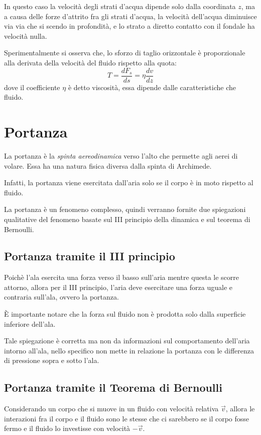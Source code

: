\documentclass[11pt, a4paper, openright]{book}
\theoremstyle{plain}
\theoremstyle{definition}
\begin{document}
In questo caso la velocità degli strati d'acqua dipende solo dalla coordinata $z$, ma a causa delle forze d'attrito fra gli strati d'acqua, la velocità dell'acqua diminuisce via via che si scendo in profondità, e lo strato a diretto contatto con il fondale ha velocità nulla.

Sperimentalmente si osserva che, lo sforzo di taglio orizzontale è proporzionale alla derivata della velocità del fluido rispetto alla quota:
\begin{equation}
    T = \frac{dF_s}{ds} = \eta \frac{dv}{dz}
\end{equation}
dove il coefficiente $\eta$ è detto viscosità, essa dipende dalle caratteristiche che fluido.

\section{Portanza}
La portanza è la \textit{spinta aereodinamica} verso l'alto che permette agli aerei di volare. Essa ha una natura fisica diversa dalla spinta di Archimede.

Infatti, la portanza viene esercitata dall'aria solo se il corpo è in moto rispetto al fluido.

La portanza è un fenomeno complesso, quindi verranno fornite due spiegazioni qualitative del fenomeno basate sul III principio della dinamica e sul teorema di Bernoulli.

\subsection{Portanza tramite il III principio}
Poichè l'ala esercita una forza verso il basso sull'aria mentre questa le scorre attorno, allora per il III principio, l'aria deve esercitare una forza uguale e contraria sull'ala, ovvero la portanza.

È importante notare che la forza sul fluido non è prodotta solo dalla superficie inferiore dell'ala.

Tale spiegazione è corretta ma non da informazioni sul comportamento dell'aria intorno all'ala, nello specifico non mette in relazione la portanza con le differenza di pressione sopra e sotto l'ala.

\subsection{Portanza tramite il Teorema di Bernoulli}
Considerando un corpo che si muove in un fluido con velocità relativa $\vec{v}$, allora le interazioni fra il corpo e il fluido sono le stesse che ci sarebbero se il corpo fosse fermo e il fluido lo investisse con velocità $-\vec{v}$.
\end{document}
